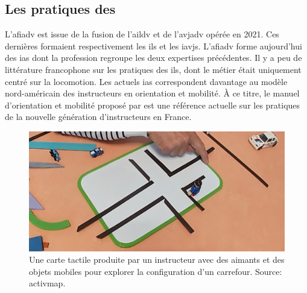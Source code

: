 
\subsection{Les pratiques des \ipas{}}

\label{pratiques_ipas}

L'\gls{afiadv} est issue de la fusion de l'\gls{aildv} et de l'\gls{avjadv} opérée en 2021. Ces dernières formaient respectivement les \glspl{il} et les \glspl{iavj}. L'\gls{afiadv} forme aujourd'hui des \glspl{ia} dont la profession regroupe les deux expertises précédentes. Il y a peu de littérature francophone sur les pratiques des \glspl{il}, dont le métier était uniquement centré sur la locomotion. Les actuels \glspl{ia} correspondent davantage au modèle nord-américain des instructeurs en orientation et mobilité. À ce titre, le manuel d'orientation et mobilité proposé par \citet{ratelle_manuel_2019} est une référence actuelle sur les pratiques de la nouvelle génération d'instructeurs en France.

\begin{figure}[ht]
    \centering
    \includegraphics[width=\textwidth]{images/etat_art/carte_didier.png}
    \caption[Carte tactile produite avec des aimants]{Une carte tactile produite par un instructeur avec des aimants et des objets mobiles pour explorer la configuration d'un carrefour. Source: \gls{activmap}.}
    \label{fig:il_carte}
\end{figure}

\newpar{}

